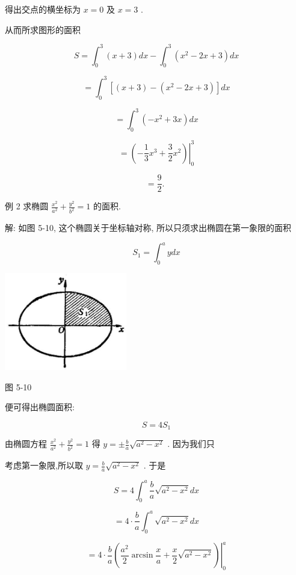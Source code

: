 \documentclass[lang=cn,newtx,12pt,scheme=chinese]{elegantbook}
\begin{document}
得出交点的横坐标为 \(x = 0\) 及 \(x = 3\) .

从而所求图形的面积

\[
S = {\int }_{0}^{3}\left( {x + 3}\right) {dx} - {\int }_{0}^{3}\left( {{x}^{2} - {2x} + 3}\right) {dx}
\]

\[
= {\int }_{0}^{3}\left\lbrack {\left( {x + 3}\right) - \left( {{x}^{2} - {2x} + 3}\right) }\right\rbrack {dx}
\]

\[
= {\int }_{0}^{3}\left( {-{x}^{2} + {3x}}\right) {dx}
\]

\[
= {\left. \left( -\frac{1}{3}{x}^{3} + \frac{3}{2}{x}^{2}\right) \right| }_{0}^{3}
\]

\[
= \frac{9}{2}\text{. }
\]

例 2 求椭圆 \(\frac{{x}^{2}}{{a}^{2}} + \frac{{y}^{2}}{{b}^{2}} = 1\) 的面积.

解: 如图 5-10, 这个椭圆关于坐标轴对称, 所以只须求出椭圆在第一象限的面积

\[
{S}_{1} = {\int }_{0}^{a}{ydx}
\]

\begin{center}
\includegraphics[max width=0.4\textwidth]{images/01912c18-5c3f-733d-b775-749ba9897a9d_233_497776.jpg}
\end{center}

图 5-10

便可得出椭圆面积:

\[
S = 4{S}_{1}
\]

由椭圆方程 \(\frac{{x}^{2}}{{a}^{2}} + \frac{{y}^{2}}{{b}^{2}} = 1\) 得 \(y = \pm \frac{b}{a}\sqrt{{a}^{2} - {x}^{2}}\) . 因为我们只

考虑第一象限,所以取 \(y = \frac{b}{a}\sqrt{{a}^{2} - {x}^{2}}\) . 于是

\[
S = 4{\int }_{0}^{a}\frac{b}{a}\sqrt{{a}^{2} - {x}^{2}}{dx}
\]

\[
= 4 \cdot \frac{b}{a}{\int }_{0}^{a}\sqrt{{a}^{2} - {x}^{2}}{dx}
\]

\[
= {\left. 4 \cdot \frac{b}{a}\left( \frac{{a}^{2}}{2}\arcsin \frac{x}{a} + \frac{x}{2}\sqrt{{a}^{2} - {x}^{2}}\right) \right| }_{0}^{a}
\]
\end{document}
